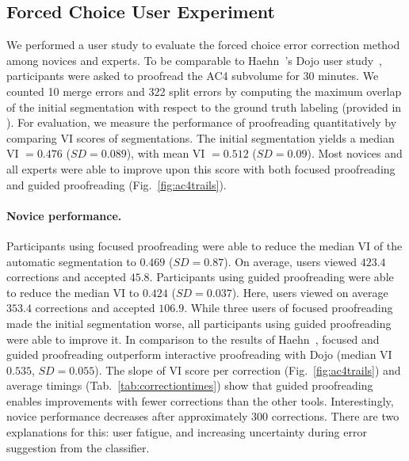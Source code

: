 \subsection{Forced Choice User Experiment}
We performed a user study to evaluate the forced choice error correction method among novices and experts. To be comparable to Haehn~\etal's Dojo user study~\cite{haehn_dojo_2014}, participants were asked to proofread the AC4 subvolume for 30 minutes. We counted 10 merge errors and 322 split errors by computing the maximum overlap of the initial segmentation with respect to the ground truth labeling (provided in \cite{haehn_dojo_2014}). For evaluation, we measure the performance of proofreading quantitatively by comparing VI scores of segmentations. 
The initial segmentation yields a median VI $=0.476$ ($SD=0.089$), with mean VI $=0.512$ ($SD=0.09$). Most novices and all experts were able to improve upon this score with both focused proofreading and guided proofreading (Fig.~\ref{fig:ac4trails}).

\vspace{-4mm}

\paragraph{Novice performance.} Participants using focused proofreading were able to reduce the median VI of the automatic segmentation to $0.469$ ($SD=0.87$). On average, users viewed $423.4$ corrections and accepted $45.8$.
Participants using guided proofreading were able to reduce the median VI to $0.424$ ($SD=0.037$). Here, users viewed on average $353.4$ corrections and accepted $106.9$.
While three users of focused proofreading made the initial segmentation worse, all participants using guided proofreading were able to improve it. In comparison to the results of Haehn~\etal, focused and guided proofreading outperform interactive proofreading with Dojo (median VI $0.535$, $SD=0.055$). The slope of VI score per correction (Fig.~\ref{fig:ac4trails}) and average timings (Tab.~\ref{tab:correctiontimes}) show that guided proofreading enables improvements with fewer corrections than the other tools. Interestingly, novice performance decreases after approximately $300$ corrections. There are two explanations for this: user fatigue, and increasing uncertainty during error suggestion from the classifier. %

